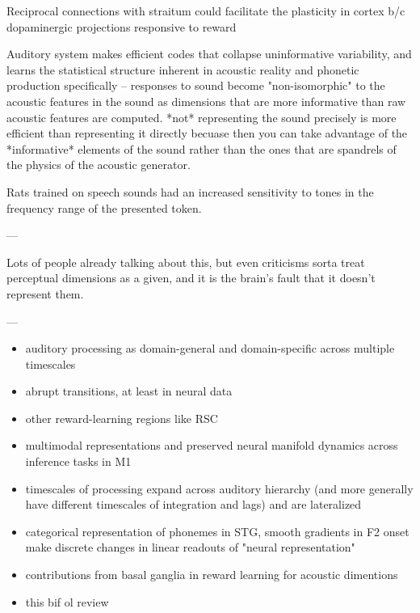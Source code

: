 Reciprocal connections with straitum could facilitate the plasticity in cortex b/c dopaminergic projections responsive to reward \cite{fengRoleHumanAuditory2018}

Auditory system makes efficient codes that collapse uninformative variability, and learns the statistical structure inherent in acoustic reality \cite{schiavoCapacitiesNeuralMechanisms2019} and phonetic production specifically\cite{kuhlNewViewLanguage2000} -- responses to sound become "non-isomorphic" to the acoustic features in the sound \cite{stilpEfficientCodingStatistically2012,wangNeuralCodingStrategies2007} as dimensions that are more informative than raw acoustic features are computed. *not* representing the sound precisely is more efficient than representing it directly becuase then you can take advantage of the *informative* elements of the sound rather than the ones that are spandrels of the physics of the acoustic generator.

Rats trained on speech sounds had an increased sensitivity to tones in the frequency range of the presented token\cite{engineerSpeechTrainingAlters2015a}.


---


Lots of people already talking about this, but even criticisms sorta treat perceptual dimensions as a given, and it is the brain's fault that it doesn't represent them. \cite{goddardInterpretingDimensionsNeural2018a}

---


\begin{itemize}
\item auditory processing as domain-general and domain-specific across multiple timescales \cite{norman-haignereHierarchicalIntegrationMultiple2020}
\item abrupt transitions, at least in neural data \cite{durstewitzAbruptTransitionsPrefrontal2010}
\item other reward-learning regions like RSC \cite{millerRetrosplenialCorticalRepresentations2019}
\item multimodal representations and preserved neural manifold dynamics across inference tasks in M1 \cite{gallegoCorticalPopulationActivity2018}
\item timescales of processing expand across auditory hierarchy (and more generally have different timescales of integration and lags) \cite{norman-haignereHierarchicalIntegrationMultiple2020} and are lateralized \cite{levyCircuitAsymmetriesUnderlie2019a}
\item categorical representation of phonemes in STG, smooth gradients in F2 onset make discrete changes in linear readouts of "neural representation" \cite{changCategoricalSpeechRepresentation2010b}
\item contributions from basal ganglia in reward learning for acoustic dimentions \cite{limHowMayBasal2014}
\item this bif ol review \cite{rauscheckerMapsStreamsAuditory2009b}
\end{itemize}



